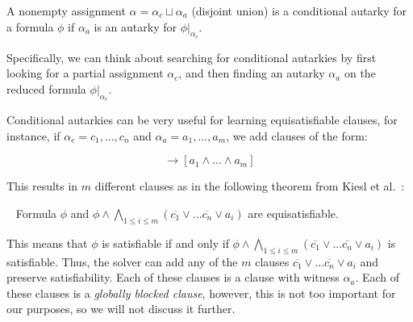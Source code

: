 \begin{definition}
    A nonempty assignment $\alpha = \alpha_c \sqcup \alpha_a$ (disjoint union) is a conditional autarky for a formula $\phi$ if $\alpha_a$ is an autarky for $\phi|_{\alpha_c}$.
\end{definition}

Specifically, we can think about searching for conditional autarkies by first looking for a partial assignment $\alpha_c$, and then finding an autarky $\alpha_a$ on the reduced formula $\phi|_{\alpha_c}$.

Conditional autarkies can be very useful for learning equisatisfiable clauses, for instance, if $\alpha_c = c_1, ..., c_n$ and $\alpha_a = a_1, ..., a_m$, we add clauses of the form:

\begin{equation*}
    [c_1 \land ... \land c_n] \rightarrow [a_1 \land ... \land a_m]
\end{equation*}

This results in $m$ different clauses as in the following theorem from Kiesl et al.~\cite{conditionalautarkies}:

\begin{theorem}~\label{thm:gbcequisat}
    Formula $\phi$ and $\phi \land \bigwedge_{1 \leq i \leq m} (\overline{c_1} \lor ... \overline{c_n} \lor a_i)$ are equisatisfiable.
\end{theorem}

This means that $\phi$ is satisfiable if and only if $\phi \land \bigwedge_{1 \leq i \leq m} (\overline{c_1} \lor ... \overline{c_n} \lor a_i)$ is satisfiable. Thus, the solver can add any of the $m$ clauses $\overline{c_1} \lor ... \overline{c_n} \lor a_i$ and preserve satisfiability. Each of these clauses is a \pr clause with witness $\alpha_a$. Each of these clauses is a \emph{globally blocked clause}, however, this is not too important for our purposes, so we will not discuss it further.



   
